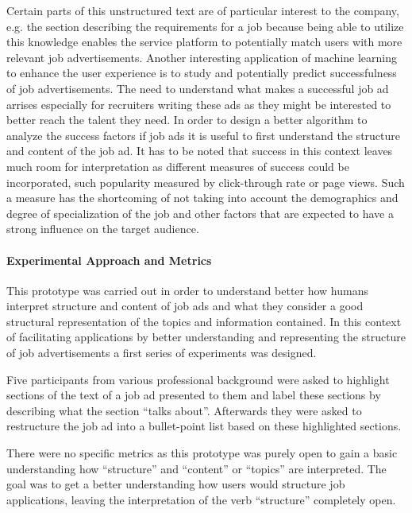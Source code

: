 Certain parts of this unstructured text are of particular interest to the company, e.g. the section describing the requirements for a job because being able to utilize this knowledge enables the service platform to potentially match users with more relevant job advertisements.
Another interesting application of machine learning to enhance the user experience is to study and potentially predict successfulness of job advertisements.
The need to understand what makes a successful job ad arrises especially for recruiters writing these ads as they might be interested to better reach the talent they need. In order to design a better algorithm to analyze the success factors if job ads it is useful to first understand the structure and content of the job ad.
It has to be noted that success in this context leaves much room for interpretation as different measures of success could be incorporated, such popularity measured by \gls{click-through rate} or \gls{page views}. Such a measure has the shortcoming of not taking into account the demographics and degree of specialization of the job and other factors that are expected to have a strong influence on the target audience.

\paragraph{Experimental Approach and Metrics}
\label{par:Experimental Approach and Metrics}

This prototype was carried out in order to understand better how humans interpret structure and content of job ads and what they consider a good structural representation of the topics and information contained. In this context of facilitating applications by better understanding and representing the structure of job advertisements a first series of experiments was designed.

Five participants from various professional background were asked to highlight sections of the text of a job ad presented to them and label these sections by describing what the section “talks about”. Afterwards they were asked to restructure the job ad into a bullet-point list based on these highlighted sections.

There were no specific metrics as this prototype was purely open to gain a basic understanding how “structure” and “content” or “topics” are interpreted.
The goal was to get a better understanding how users would structure job applications, leaving the interpretation of the verb ``structure'' completely open.

